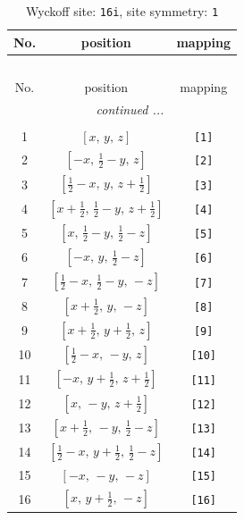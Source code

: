 \documentclass[fleqn,8pt]{jsarticle}
\begin{document}
\begin{longtable}{ccc}
\caption{Wyckoff site: {\tt 16i}, site symmetry: {\tt 1}}
 \\
 \hline \hline
No. & position & mapping \\ \hline \endfirsthead

\multicolumn{2}{l}{\tablename\ \thetable{}} \\
 \hline \hline
No. & position & mapping \\ \hline \endhead

 \hline \hline
\multicolumn{2}{r}{\footnotesize\it continued ...} \\ \endfoot

 \hline \hline
\multicolumn{2}{r}{} \\ \endlastfoot

1 & $\left[ x,\, y,\, z \right]$ & {\tt [1]} \\ \hline
2 & $\left[ - x,\, \frac{1}{2} - y,\, z \right]$ & {\tt [2]} \\ \hline
3 & $\left[ \frac{1}{2} - x,\, y,\, z + \frac{1}{2} \right]$ & {\tt [3]} \\ \hline
4 & $\left[ x + \frac{1}{2},\, \frac{1}{2} - y,\, z + \frac{1}{2} \right]$ & {\tt [4]} \\ \hline
5 & $\left[ x,\, \frac{1}{2} - y,\, \frac{1}{2} - z \right]$ & {\tt [5]} \\ \hline
6 & $\left[ - x,\, y,\, \frac{1}{2} - z \right]$ & {\tt [6]} \\ \hline
7 & $\left[ \frac{1}{2} - x,\, \frac{1}{2} - y,\, - z \right]$ & {\tt [7]} \\ \hline
8 & $\left[ x + \frac{1}{2},\, y,\, - z \right]$ & {\tt [8]} \\ \hline
9 & $\left[ x + \frac{1}{2},\, y + \frac{1}{2},\, z \right]$ & {\tt [9]} \\ \hline
10 & $\left[ \frac{1}{2} - x,\, - y,\, z \right]$ & {\tt [10]} \\ \hline
11 & $\left[ - x,\, y + \frac{1}{2},\, z + \frac{1}{2} \right]$ & {\tt [11]} \\ \hline
12 & $\left[ x,\, - y,\, z + \frac{1}{2} \right]$ & {\tt [12]} \\ \hline
13 & $\left[ x + \frac{1}{2},\, - y,\, \frac{1}{2} - z \right]$ & {\tt [13]} \\ \hline
14 & $\left[ \frac{1}{2} - x,\, y + \frac{1}{2},\, \frac{1}{2} - z \right]$ & {\tt [14]} \\ \hline
15 & $\left[ - x,\, - y,\, - z \right]$ & {\tt [15]} \\ \hline
16 & $\left[ x,\, y + \frac{1}{2},\, - z \right]$ & {\tt [16]} \\
\end{longtable}
\end{document}
